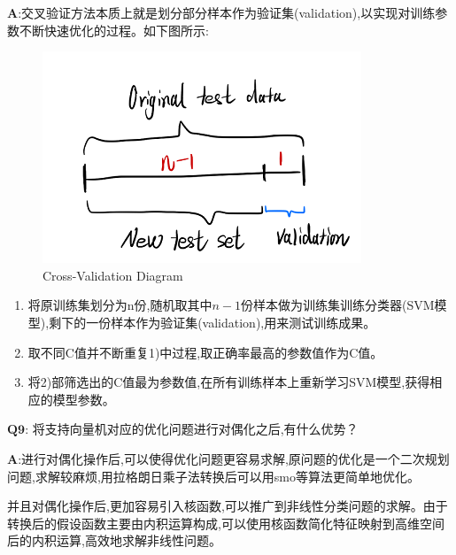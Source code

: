 \documentclass[homework]{IEEEtran}
\begin{document}
\begin{CJK}{UTF8}{gkai}
$\mathbf{A}$:交叉验证方法本质上就是划分部分样本作为验证集(validation),以实现对训练参数不断快速优化的过程。如下图所示:
\begin{figure}[htb]
    \centerline{\includegraphics{Images/fig4.png}}
    \caption{Cross-Validation Diagram}
    \label{fig4}
    \end{figure}
\begin{enumerate}
	\item 将原训练集划分为n份,随机取其中$n-1$份样本做为训练集训练分类器(SVM模型),剩下的一份样本作为验证集(validation),用来测试训练成果。
	\item 取不同C值并不断重复1)中过程,取正确率最高的参数值作为C值。
	\item 将2)部筛选出的C值最为参数值,在所有训练样本上重新学习SVM模型,获得相应的模型参数。
\end{enumerate}\par
$\mathbf{Q9}$:	将支持向量机对应的优化问题进行对偶化之后,有什么优势？\par
$\mathbf{A}$:进行对偶化操作后,可以使得优化问题更容易求解,原问题的优化是一个二次规划问题,求解较麻烦,用拉格朗日乘子法转换后可以用smo等算法更简单地优化。  \par
并且对偶化操作后,更加容易引入核函数,可以推广到非线性分类问题的求解。由于转换后的假设函数主要由内积运算构成,可以使用核函数简化特征映射到高维空间后的内积运算,高效地求解非线性问题。

\end{CJK}

\vspace{10mm}
\end{document}
